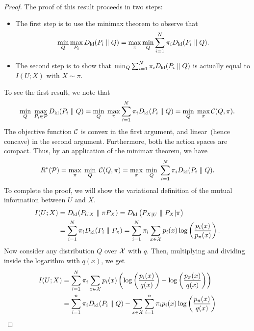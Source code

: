     \begin{proof}
        The proof of this result proceeds in two steps: 
        \begin{itemize}
            \item The first step is to use the minimax theorem to observe that 
            \begin{align}
                \min_{Q} \max_{P_i} D_{\text{kl}}(P_i \parallel Q) = \max_{\pi} \min_{Q} \sum_{i=1}^N \pi_i D_{\text{kl}}(P_i \parallel Q). 
            \end{align}
            \item The second step is to show that $\min_{Q} \sum_{i=1}^N \pi_i D_{\text{kl}}(P_i \parallel Q)$ is actually equal to $I(U; X)$ with $X \sim \pi$. 
        \end{itemize}
        To see the first result, we note that 
        \begin{align}
            \min_{Q} \; \max_{P_i \in \mathcal{P}} D_{\text{kl}}(P_i \parallel Q) = \min_{Q} \; \max_{\pi} \sum_{i=1}^N \pi_i D_{\text{kl}}(P_i \parallel Q) =  \min_{Q} \; \max_{\pi} \mathcal{C}(Q, \pi). 
        \end{align}
        The objective function $\mathcal{C}$ is convex in the first argument, and linear~(hence concave) in the second argument. Furthermore, both the action spaces are compact. Thus, by an application of the minimax theorem, we have 
        \begin{align}
            R^*(\mathcal{P}) = \max_{\pi}\; \min_{Q} \; \mathcal{C}(Q, \pi) = \max_{\pi}\; \min_{Q} \; \sum_{i=1}^N \pi_i D_{\text{kl}}(P_i \parallel Q). 
        \end{align}
        To complete the proof, we will show the variational definition of the mutual information between $U$ and $X$. 
        \begin{align}
            I(U; X) & = D_{\text{kl}}( P_{UX} \parallel \pi P_X) = D_{\text{kl}} \left( P_{X|U} \parallel P_X | \pi \right) \\
            & = \sum_{i=1}^N \pi_i D_{\text{kl}}(P_i \parallel P_\pi) = \sum_{i=1}^N \pi_i \sum_{x \in \mathcal{X}} p_i(x) \log \left( \frac{p_i(x)}{p_\pi(x)} \right). 
        \end{align}
        Now consider any distribution $Q$ over $\mathcal{X}$ with \pmf $q$. Then, multiplying and dividing inside the logarithm with $q(x)$, we get 
        \begin{align}
            I(U;X) & = \sum_{i=1}^N \pi_i \sum_{x \in \X} p_i(x) \lp \log \lp \frac{p_i(x)}{q(x)} \rp - \log \lp \frac{p_\pi(x)}{q(x)} \rp  \rp \\
            & = \sum_{i=1}^n \pi_i \dkl(P_i \parallel Q) - \sum_{x \in \X} \sum_{i=1}^n \pi_i p_i(x) \log \lp \frac{p_\pi(x)}{q(x)} \rp  \\

\end{align}
\end{proof}
